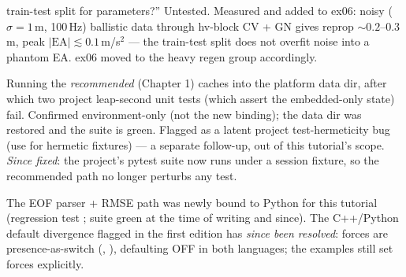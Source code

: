 \begin{description}
train-test split for parameters?'' Untested. Measured and added to ex06:
noisy ($\sigma{=}1\,$m, 100\,Hz) ballistic data through hv-block CV + GN
gives reprop ${\sim}0.2$--$0.3\,$m, peak $|\mathrm{EA}|\lesssim0.1\,$m/s$^2$
--- the train-test split does not overfit noise into a phantom EA. ex06
moved to the heavy regen group accordingly.
\item[Non-hermetic leap tests] Running the \emph{recommended}
 (Chapter 1) caches 
into the platform data dir, after which two project leap-second unit
tests (which assert the embedded-only state) fail. Confirmed
environment-only (not the new binding); the data dir was restored and the
suite is green. Flagged as a latent project test-hermeticity bug
(use  for hermetic fixtures) --- a separate
follow-up, out of this tutorial's scope. \emph{Since fixed}:
the project's pytest suite now runs under a session
 fixture, so the recommended  path no
longer perturbs any test.
\end{description}

The EOF parser + RMSE path was newly bound to Python for this tutorial
(regression test ; suite green
at the time of writing and since). The C++/Python 
default divergence flagged in the first edition has \emph{since been
resolved}: forces are presence-as-switch (,
), defaulting OFF in both languages; the examples still
set forces explicitly.
